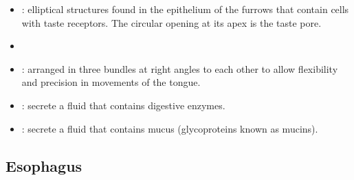 \begin{itemize}
\begin{multicols}{2}
\begin{itemize}
    \item {}: elliptical structures found in the epithelium of the furrows that contain cells with taste receptors. The circular opening at its apex is the taste pore.
    
    \begin{center}
    \end{center}

    \item {}
    
    \begin{center}
    \end{center}
    
    \item {}: arranged in three bundles at right angles to each other to allow flexibility and precision in movements of the tongue.
    
    \begin{center}
    \end{center}
    
    \item {}: secrete a fluid that contains digestive enzymes.
    
    \begin{center}
    \end{center}
    
    \item {}: secrete a fluid that contains mucus (glycoproteins known as mucins).
    
    \begin{center}
    \end{center}
    
  \end{itemize}
  \end{multicols}

  \subsection{Esophagus}\label{Esophagus}
  
  \begin{center}
  \end{center}
  

\end{itemize}
